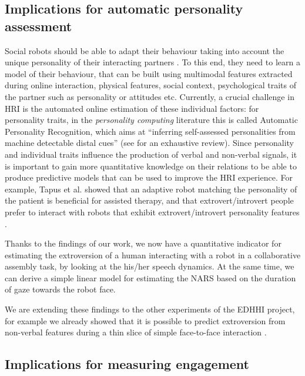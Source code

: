 \subsection{Implications for automatic personality assessment}


Social robots should be able to adapt their behaviour taking into account the unique personality of their interacting partners \cite{Anzalone2012profile}. To this end, they need to learn a model of their behaviour, that can be built using multimodal features extracted during online interaction, physical features, social context, psychological traits of the partner such as personality or attitudes etc.
Currently, a crucial challenge in HRI is the automated online estimation of these individual factors: for personality traits, in the \emph{personality computing} literature this is called Automatic Personality Recognition, which aims at ``inferring self-assessed personalities from machine detectable distal cues'' (see \cite{Vinciarelli14} for an exhaustive review).  
Since personality and individual traits influence the production of verbal and non-verbal signals, it is important to gain more quantitative knowledge on their relations to be able to produce predictive models that can be used to improve the HRI experience.
For example, Tapus et al. \cite{Tapus08,Tapus08b} showed that an adaptive robot matching the personality of the patient is beneficial for assisted therapy, and that extrovert/introvert people prefer to interact with robots that exhibit extrovert/introvert personality features \cite{Aly2013personality}. 

Thanks to the findings of our work, we now have a quantitative indicator for estimating the extroversion of a human interacting with a robot in a collaborative assembly task, by looking at the his/her speech dynamics. At the same time, we can derive a simple linear model for estimating the NARS based on the duration of gaze towards the robot face. 

We are extending these findings to the other experiments of the EDHHI project, for example we already showed that it is possible to predict extroversion from non-verbal features during a thin slice of simple face-to-face interaction \cite{ICSR2015}.




\subsection{Implications for measuring engagement}

